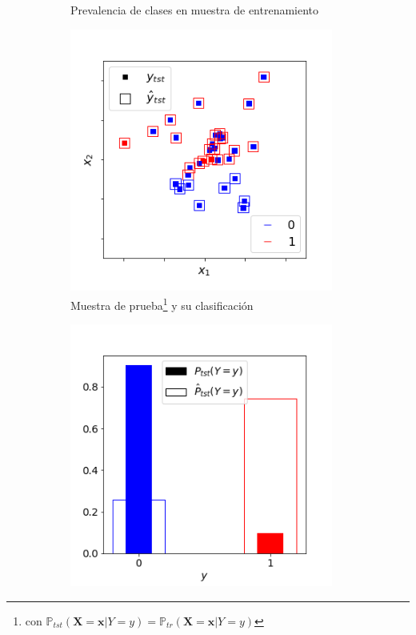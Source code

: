 \begin{figure}[!h]
\begin{subfigure}[t]{0.45\textwidth}
        \caption{Prevalencia de clases en muestra de
        entrenamiento}\label{cambios:prevalencia_tr}
    \end{subfigure}
    \medskip
    \begin{subfigure}[t]{0.45\textwidth}
        \centering
        \includegraphics[width=0.95\textwidth]{../plots_teoria/cambios_test_scatterplot.png}
        \caption{Muestra de prueba\footnote{con
        $\mathbb{P}_{tst}(\boldsymbol{X}=\boldsymbol{x}|Y=y) =
        \mathbb{P}_{tr}(\boldsymbol{X}=\boldsymbol{x}|Y=y)$} y su
        clasificación}\label{cambios:clasificacion_tst}
    \end{subfigure}
    \hfill
    \begin{subfigure}[t]{0.45\textwidth}
        \centering
        \includegraphics[width=0.95\textwidth]{../plots_teoria/cambios_test_barplot.png}

\end{subfigure}
\end{figure}
